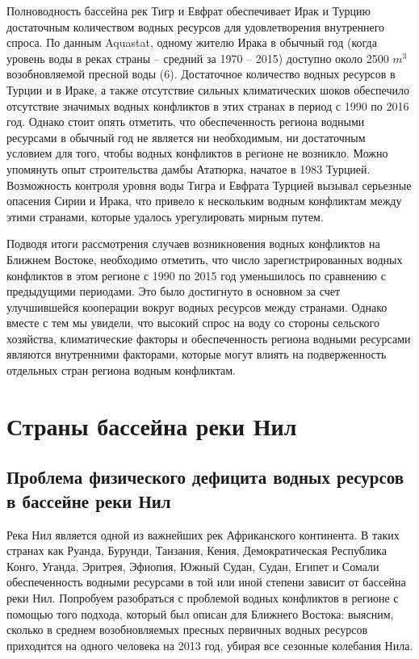 \documentclass[a4paper, 12pt]{article}
\theoremstyle{plain} %
\theoremstyle{definition} %
\theoremstyle{remark} %
\begin{document}
Полноводность бассейна рек Тигр и Евфрат обеспечивает Ирак и Турцию достаточным количеством водных ресурсов для удовлетворения внутреннего спроса. По данным Aquastat, одному жителю Ирака в обычный год (когда уровень воды в реках страны – средний за 1970 – 2015) доступно около 2500 $m^3$ возобновляемой пресной воды (6). Достаточное количество водных ресурсов в Турции и в Ираке, а также отсутствие сильных климатических шоков обеспечило отсутствие значимых водных конфликтов в этих странах в период с 1990 по 2016 год. Однако стоит опять отметить, что обеспеченность региона водными ресурсами в обычный год не является ни необходимым, ни достаточным условием для того, чтобы водных конфликтов в регионе не возникло. Можно упомянуть опыт строительства дамбы Ататюрка, начатое в 1983 Турцией. Возможность контроля уровня воды Тигра и Евфрата Турцией вызывал серьезные опасения Сирии и Ирака, что привело к нескольким водным конфликтам между этими странами, которые удалось урегулировать мирным путем. 

Подводя итоги рассмотрения случаев возникновения водных конфликтов на Ближнем Востоке, необходимо отметить, что число зарегистрированных водных конфликтов в этом регионе с 1990 по 2015 год уменьшилось по сравнению с предыдущими периодами. Это было достигнуто в основном за счет улучшившейся кооперации вокруг водных ресурсов между странами. Однако вместе с тем мы увидели, что высокий спрос на воду со стороны сельского хозяйства, климатические факторы и обеспеченность региона водными ресурсами являются внутренними факторами, которые могут влиять на подверженность отдельных стран региона водным конфликтам.

\section{Страны бассейна реки Нил}
\subsection{Проблема физического дефицита водных ресурсов в бассейне реки Нил}
Река Нил является одной из важнейших рек Африканского континента. В таких странах как Руанда, Бурунди, Танзания, Кения, Демократическая Республика Конго, Уганда, Эритрея, Эфиопия, Южный Судан, Судан, Египет и Сомали обеспеченность водными ресурсами в той или иной степени зависит от бассейна реки Нил. Попробуем разобраться с проблемой водных конфликтов в регионе с помощью того подхода, который был описан для Ближнего Востока: выясним, сколько в среднем возобновляемых пресных первичных водных ресурсов приходится на одного человека на 2013 год, убирая все сезонные колебания Нила. 
\end{document}

